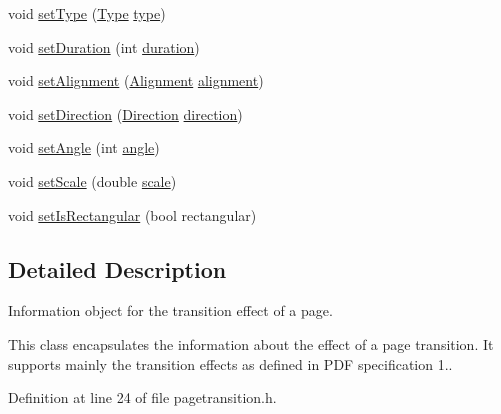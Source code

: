 \begin{DoxyCompactItemize}
\item 
void \hyperlink{classOkular_1_1PageTransition_a5fe9ce73f77b9c2462a8c67136820d22}{set\+Type} (\hyperlink{classOkular_1_1PageTransition_a3e8b592a5a587ec0c3a9855d5d2687df}{Type} \hyperlink{classOkular_1_1PageTransition_a6978037265846c93fa891e903b9a73c6}{type})
\item 
void \hyperlink{classOkular_1_1PageTransition_a735dec18b08dee7319d542faa1eb33bb}{set\+Duration} (int \hyperlink{classOkular_1_1PageTransition_a313dcaa11f3432a6d5f184311b181fb1}{duration})
\item 
void \hyperlink{classOkular_1_1PageTransition_a11bffd612eb921e4405b8c20ba657140}{set\+Alignment} (\hyperlink{classOkular_1_1PageTransition_ab8b9f1414ab5aaf9d54c8952b0134ad9}{Alignment} \hyperlink{classOkular_1_1PageTransition_a8bfb7a26fa3d2ea4ac5554c7814a9167}{alignment})
\item 
void \hyperlink{classOkular_1_1PageTransition_a34f13c5f45aa5360243c45869c4e02d5}{set\+Direction} (\hyperlink{classOkular_1_1PageTransition_a5b8bef87847dd9eef0c6b642180c93d9}{Direction} \hyperlink{classOkular_1_1PageTransition_aec8f5d80619b641f144a69b0b0eae5d8}{direction})
\item 
void \hyperlink{classOkular_1_1PageTransition_a397bfdd0b762930880df772f9741dd51}{set\+Angle} (int \hyperlink{classOkular_1_1PageTransition_abe85ca649285fbceef648aa5e095b971}{angle})
\item 
void \hyperlink{classOkular_1_1PageTransition_acf0ab034eee1be1d5bf8365dffb2581a}{set\+Scale} (double \hyperlink{classOkular_1_1PageTransition_abe49d76f577d43a115b2ff542e99f674}{scale})
\item 
void \hyperlink{classOkular_1_1PageTransition_a5efb8c057e356f0ea8eeee71800b3949}{set\+Is\+Rectangular} (bool rectangular)
\end{DoxyCompactItemize}


\subsection{Detailed Description}
Information object for the transition effect of a page. 

This class encapsulates the information about the effect of a page transition. It supports mainly the transition effects as defined in P\+D\+F specification 1.. 

Definition at line 24 of file pagetransition.\+h.



